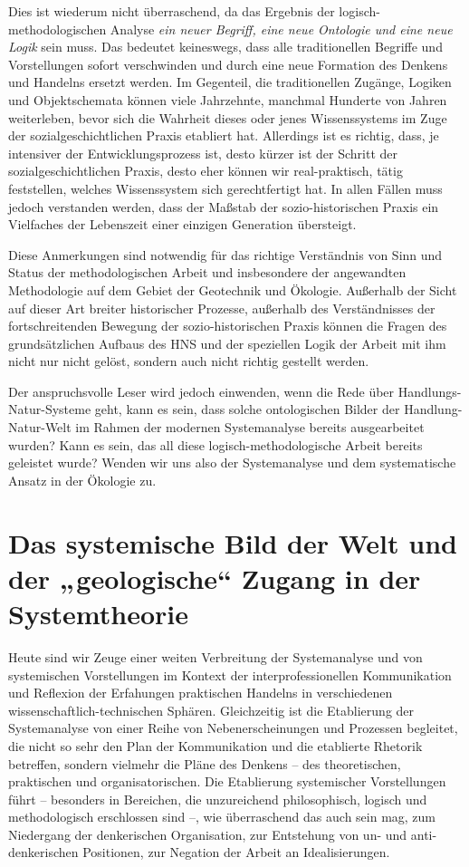 \documentclass[11pt,a4paper]{article}
\begin{document}
Dies ist wiederum nicht überraschend, da das Ergebnis der
logisch-methodologischen Analyse \emph{ein neuer Begriff, eine neue Ontologie
  und eine neue Logik} sein muss. Das bedeutet keineswegs, dass alle
traditionellen Begriffe und Vorstellungen sofort verschwinden und durch eine
neue Formation des Denkens und Handelns ersetzt werden.  Im Gegenteil, die
traditionellen Zugänge, Logiken und Objektschemata können viele Jahrzehnte,
manchmal Hunderte von Jahren weiterleben, bevor sich die Wahrheit dieses oder
jenes Wissenssystems im Zuge der sozialgeschichtlichen Praxis etabliert hat.
Allerdings ist es richtig, dass, je intensiver der Entwicklungsprozess ist,
desto kürzer ist der Schritt der sozialgeschichtlichen Praxis, desto eher
können wir real-praktisch, tätig feststellen, welches Wissenssystem sich
gerechtfertigt hat. In allen Fällen muss jedoch verstanden werden, dass der
Maßstab der sozio-historischen Praxis ein Vielfaches der Lebenszeit einer
einzigen Generation übersteigt.

Diese Anmerkungen sind notwendig für das richtige Verständnis von Sinn und
Status der methodologischen Arbeit und insbesondere der angewandten
Methodologie auf dem Gebiet der Geotechnik und Ökologie. Außerhalb der Sicht
auf dieser Art breiter historischer Prozesse, außerhalb des Verständnisses der
fortschreitenden Bewegung der sozio-historischen Praxis können die Fragen des
grundsätzlichen Aufbaus des HNS und der speziellen Logik der Arbeit mit ihm
nicht nur nicht gelöst, sondern auch nicht richtig gestellt werden.

Der anspruchsvolle Leser wird jedoch einwenden, wenn die Rede über
Handlungs-Natur-Systeme geht, kann es sein, dass solche ontologischen Bilder
der Handlung-Natur-Welt im Rahmen der modernen Systemanalyse bereits
ausgearbeitet wurden?  Kann es sein, das all diese logisch-methodologische
Arbeit bereits geleistet wurde? Wenden wir uns also der Systemanalyse und dem
systematische Ansatz in der Ökologie zu.

\section{Das systemische Bild der Welt und der „geologische“ Zugang in der
  Systemtheorie} 

Heute sind wir Zeuge einer weiten Verbreitung der Systemanalyse und von
systemischen Vorstellungen im Kontext der interprofessionellen Kommunikation
und Reflexion der Erfahungen praktischen Handelns in verschiedenen
wissenschaftlich-technischen Sphären.  Gleichzeitig ist die Etablierung der
Systemanalyse von einer Reihe von Nebenerscheinungen und Prozessen begleitet,
die nicht so sehr den Plan der Kommunikation und die etablierte Rhetorik
betreffen, sondern vielmehr die Pläne des Denkens -- des theoretischen,
praktischen und organisatorischen. Die Etablierung systemischer Vorstellungen
führt -- besonders in Bereichen, die unzureichend philosophisch, logisch und
methodologisch erschlossen sind --, wie überraschend das auch sein mag, zum
Niedergang der denkerischen Organisation, zur Entstehung von un- und
anti-denkerischen Positionen, zur Negation der Arbeit an Idealisierungen.
\end{document}
